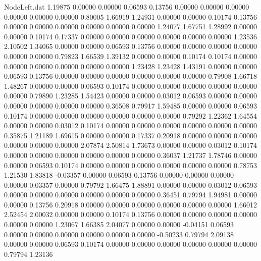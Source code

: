\begin{filecontents}{NodeLeft.dat}
   1.19875    0.00000    0.00000     0.06593    0.13756    0.00000    0.00000    0.00000    0.00000    0.00000    0.00000    0.80005    1.66919
   1.24931    0.00000    0.00000     0.10174    0.13756    0.00000    0.00000    0.00000    0.00000    0.00000    0.00000    1.24077    1.67751
   1.28992    0.00000    0.00000     0.10174    0.17337    0.00000    0.00000    0.00000    0.00000    0.00000    0.00000    1.23536    2.10502
   1.34065    0.00000    0.00000     0.06593    0.13756    0.00000    0.00000    0.00000    0.00000    0.00000    0.00000    0.79823    1.66539
   1.39132    0.00000    0.00000     0.10174    0.10174    0.00000    0.00000    0.00000    0.00000    0.00000    0.00000    1.23428    1.23428
   1.43191    0.00000    0.00000     0.06593    0.13756    0.00000    0.00000    0.00000    0.00000    0.00000    0.00000    0.79908    1.66718
   1.48267    0.00000    0.00000     0.06593    0.10174    0.00000    0.00000    0.00000    0.00000    0.00000    0.00000    0.79890    1.23285
   1.54423    0.00000    0.00000     0.03012    0.06593    0.00000    0.00000    0.00000    0.00000    0.00000    0.00000    0.36508    0.79917
   1.59485    0.00000    0.00000     0.06593    0.10174    0.00000    0.00000    0.00000    0.00000    0.00000    0.00000    0.79292    1.22362
   1.64554    0.00000    0.00000     0.03012    0.10174    0.00000    0.00000    0.00000    0.00000    0.00000    0.00000    0.35875    1.21189
   1.69615    0.00000    0.00000     0.17337    0.20918    0.00000    0.00000    0.00000    0.00000    0.00000    0.00000    2.07874    2.50814
   1.73673    0.00000    0.00000     0.03012    0.10174    0.00000    0.00000    0.00000    0.00000    0.00000    0.00000    0.36037    1.21737
   1.78746    0.00000    0.00000     0.06593    0.10174    0.00000    0.00000    0.00000    0.00000    0.00000    0.00000    0.78753    1.21530
   1.83818   -0.03357    0.00000     0.06593    0.13756    0.00000    0.00000    0.00000    0.00000    0.03357    0.00000    0.79792    1.66475
   1.88891    0.00000    0.00000     0.03012    0.06593    0.00000    0.00000    0.00000    0.00000    0.00000    0.00000    0.36451    0.79794
   1.94981    0.00000    0.00000     0.13756    0.20918    0.00000    0.00000    0.00000    0.00000    0.00000    0.00000    1.66012    2.52454
   2.00032    0.00000    0.00000     0.10174    0.13756    0.00000    0.00000    0.00000    0.00000    0.00000    0.00000    1.23067    1.66385
   2.04077    0.00000    0.00000    -0.04151    0.06593    0.00000    0.00000    0.00000    0.00000    0.00000    0.00000   -0.50233    0.79794
   2.09138    0.00000    0.00000     0.06593    0.10174    0.00000    0.00000    0.00000    0.00000    0.00000    0.00000    0.79794    1.23136

\end{filecontents}
